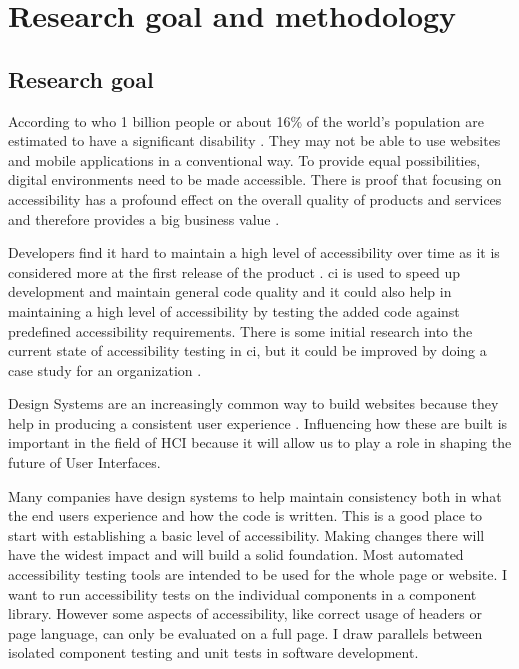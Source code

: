 \documentclass{master_thesis}
\begin{document}
\section{Research goal and methodology}
\subsection{Research goal}


According to \ac{who} 1 billion people or about 16\% of the world's population are estimated to have a significant disability \citep{WHO2022}. They may not be able to use websites and mobile applications in a conventional way. To provide equal possibilities, digital environments need to be made accessible. There is proof that focusing on accessibility has a profound effect on the overall quality of products and services and therefore provides a big business value \citep{Miesenberger2020}.

Developers find it hard to maintain a high level of accessibility over time as it is considered more at the first release of the product \citep{Paterno2020}. \ac{ci} is used to speed up development and maintain general code quality \citep{Zhao2017} and it could also help in maintaining a high level of accessibility by testing the added code against predefined accessibility requirements. There is some initial research into the current state of accessibility testing in \ac{ci}, but it could be improved by doing a case study for an organization \citep{Sane2021}.

Design Systems are an increasingly common way to build websites because they help in producing a consistent user experience \citep{Yew2020}. Influencing how these are built is important in the field of HCI because it will allow us to play a role in shaping the future of User Interfaces.

Many companies have design systems to help maintain consistency both in what the end users experience and how the code is written. This is a good place to start with establishing a basic level of accessibility. Making changes there will have the widest impact and will build a solid foundation. Most automated accessibility testing tools are intended to be used for the whole page or website. I want to run accessibility tests on the individual components in a component library. However some aspects of accessibility, like correct usage of headers or page language, can only be evaluated on a full page. I draw parallels between isolated component testing and unit tests in software development.
\end{document}
